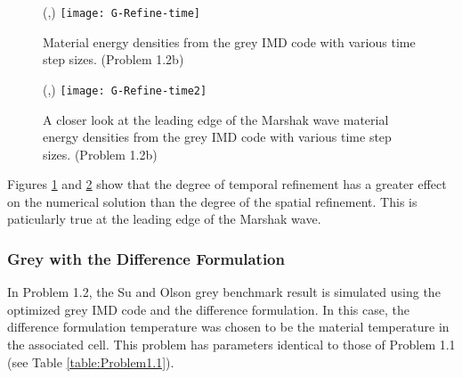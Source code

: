 \begin{figure}[htbp]
	\begin{center}
		\begin{minipage}[t]{6in}
		\centering
		\begin{picture}(\width,\height)
	                {\texttt{[image: G-Refine-time]}}
		\end{picture}
		\caption{\label{fig:Grey-Tempral-Refinment1} Material energy densities from the grey IMD code with various time step sizes. (Problem 1.2b)}
		\end{minipage} %
	\end{center}
\end{figure}

\begin{figure}[htbp]
	\begin{center}
		\begin{minipage}[t]{6in}
		\centering
		\begin{picture}(\width,\height)
	                {\texttt{[image: G-Refine-time2]}}
		\end{picture}
		\caption{\label{fig:Grey-Tempral-Refinment2} A closer look at the leading edge of the Marshak wave material energy densities from the grey IMD code with various time step sizes. (Problem 1.2b)}
		\end{minipage} %
	\end{center}
\end{figure}

	Figures \ref{fig:Grey-Tempral-Refinment1} and \ref{fig:Grey-Tempral-Refinment2} show that the degree of temporal refinement has a greater effect on the numerical solution than the degree of the spatial refinement. This is paticularly true at the leading edge of the Marshak wave.
\subsubsection{Grey with the Difference Formulation}
\label{sec:Grey_w/df}

	In Problem 1.2, the Su and Olson grey benchmark result is simulated using the optimized grey IMD code and the difference formulation. In this case, the difference formulation temperature was chosen to be the material temperature in the associated cell. This problem has parameters identical to those of Problem 1.1 (see Table \ref{table:Problem1.1}).

